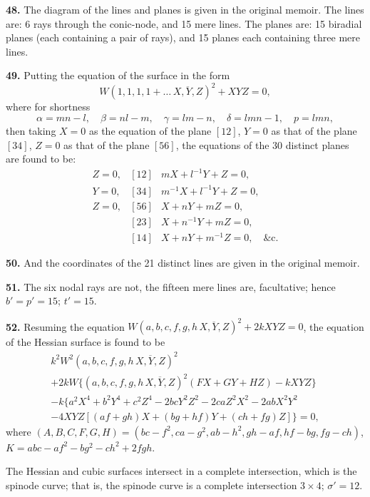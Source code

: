 \documentclass[11pt,a4paper]{article}
\theoremstyle{definition}
\begin{document}
\textbf{48.} The diagram of the lines and planes is given in the original memoir. The lines are: 6 rays through the conic-node, and 15 mere lines. The planes are: 15 biradial planes (each containing a pair of rays), and 15 planes each containing three mere lines.

\textbf{49.} Putting the equation of the surface in the form
\[
W(1, 1, 1, 1 + \ldots \,\overline{\!\!X, Y, Z\!\!})^2 + XYZ = 0,
\]
where for shortness
\[
\alpha = mn - l, \quad \beta = nl - m, \quad \gamma = lm - n, \quad \delta = lmn - 1, \quad p = lmn,
\]
then taking $X = 0$ as the equation of the plane $[12]$, $Y = 0$ as that of the plane $[34]$, $Z = 0$ as that of the plane $[56]$, the equations of the 30 distinct planes are found to be:
\[
\begin{array}{lll}
Z = 0, & [12] & mX + l^{-1}Y + Z = 0, \\
Y = 0, & [34] & m^{-1}X + l^{-1}Y + Z = 0, \\
Z = 0, & [56] & X + nY + mZ = 0, \\
& [23] & X + n^{-1}Y + mZ = 0, \\
& [14] & X + nY + m^{-1}Z = 0, \quad \text{\&c.}
\end{array}
\]

\textbf{50.} And the coordinates of the 21 distinct lines are given in the original memoir.

\textbf{51.} The six nodal rays are not, the fifteen mere lines are, facultative; hence $b' = p' = 15$; $t' = 15$.

\textbf{52.} Resuming the equation $W(a, b, c, f, g, h \,\overline{\!\!X, Y, Z\!\!})^2 + 2kXYZ = 0$, the equation of the Hessian surface is found to be
\begin{multline*}
k^2W^2(a, b, c, f, g, h \,\overline{\!\!X, Y, Z\!\!})^2 \\
+ 2kW\{(a, b, c, f, g, h \,\overline{\!\!X, Y, Z\!\!})^2(FX + GY + HZ) - kXYZ\} \\
- k\{a^2X^4 + b^2Y^4 + c^2Z^4 - 2bcY^2Z^2 - 2caZ^2X^2 - 2abX^2Y^2 \\
- 4XYZ[(af + gh)X + (bg + hf)Y + (ch + fg)Z]\} = 0,
\end{multline*}
where $(A, B, C, F, G, H) = (bc - f^2, ca - g^2, ab - h^2, gh - af, hf - bg, fg - ch)$, $K = abc - af^2 - bg^2 - ch^2 + 2fgh$.

The Hessian and cubic surfaces intersect in a complete intersection, which is the spinode curve; that is, the spinode curve is a complete intersection $3 \times 4$; $\sigma' = 12$.
\end{document}
